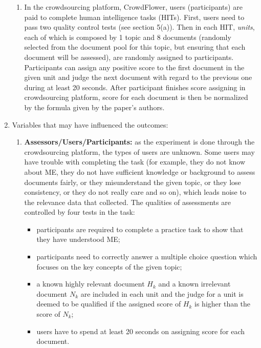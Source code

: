 \documentclass{article}
\begin{document}
\begin{enumerate}
\begin{enumerate}
	\item In the crowdsourcing platform, CrowdFlower, users (participants) are paid to complete human intelligence tasks (HITs). First, users need to pass two quality control tests (see section 5(a)). Then in each HIT, \textit{units}, each of which is composed by 1 topic and 8 documents (randomly selected from the document pool for this topic, but ensuring that each document will be assessed), are randomly assigned to participants. Participants can assign any positive score to the first document in the given unit and judge the next document with regard to the previous one during at least 20 seconds. After participant finishes score assigning in crowdsourcing platform, score for each document is then be normalized by the formula given by the paper's authors.
	\end{enumerate}
\item Variables that may have influenced the outcomes:
	\begin{enumerate}
	\item \textbf{Assessors/Users/Participants:} as the experiment is done through the crowdsourcing platform, the types of users are unknown. Some users may have trouble with completing the task (for example, they do not know about ME, they do not have sufficient knowledge or background to assess documents fairly, or they misunderstand the given topic, or they lose consistency, or they do not really care and so on), which leads noise to the relevance data that  collected. The qualities of assessments are controlled by four tests in the task:
	\begin{itemize}
	\item participants are required to complete a practice task to show that they have understood ME;
	\item participants need to correctly answer a multiple choice question which focuses on the key concepts of the given topic; 
	\item a known highly relevant document $H_k$ and a known irrelevant document $N_k$ are included in each unit and the judge for a unit is deemed to be qualified if the assigned score of $H_k$ is higher than the score of $N_k$;
	\item users have to spend at least 20 seconds on assigning score for each document.
	\end{itemize}


\end{enumerate}
\end{enumerate}
\end{document}
